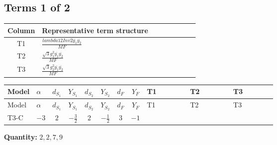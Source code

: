 \documentclass[8pt]{article}
\begin{document}
\begin{landscape}
\subsection*{Terms 1 of 2}
\begin{center}
\begin{tabular}{@{}c >{\raggedright\arraybackslash}p{0.82\linewidth}@{}}
\toprule
Column & Representative term structure \\
\midrule
T1 & \(\displaystyle \frac{lambda12Inv2 \overline{y_{1}} \overline{y_{2}}}{MF}\) \\
\midrule
T2 & \(\displaystyle \frac{\sqrt{3} g_{1}^{2} \overline{y_{1}} \overline{y_{2}}}{MF}\) \\
\midrule
T3 & \(\displaystyle \frac{\sqrt{3} g_{2}^{2} \overline{y_{1}} \overline{y_{2}}}{MF}\) \\
\midrule
\bottomrule
\end{tabular}
\end{center}
\smallskip
\tiny
\begin{longtable}{@{}llcccccc >{\raggedright\arraybackslash}p{0.21\linewidth} >{\raggedright\arraybackslash}p{0.21\linewidth} >{\raggedright\arraybackslash}p{0.21\linewidth}@{}}
\toprule
Model & $\alpha$ & $d_{S_1}$ & $Y_{S_1}$ & $d_{S_2}$ & $Y_{S_2}$ & $d_F$ & $Y_F$ & T1 & T2 & T3 \\
\midrule
\endfirsthead
\toprule
Model & $\alpha$ & $d_{S_1}$ & $Y_{S_1}$ & $d_{S_2}$ & $Y_{S_2}$ & $d_F$ & $Y_F$ & T1 & T2 & T3 \\
\midrule
\endhead
T3-C & $-3$ & $2$ & $-\frac{3}{2}$ & $2$ & $-\frac{1}{2}$ & $3$ & $-1$ & \scriptsize\adjustbox{max width=\linewidth}{$\begin{gathered} - \frac{lambda12Inv2 \overline{y_{1}} \overline{y_{2}}}{3 MF}\end{gathered}$} & \scriptsize\adjustbox{max width=\linewidth}{$\begin{gathered} - \frac{\sqrt{3} g_{1}^{2} \overline{y_{1}} \overline{y_{2}}}{2 MF}\end{gathered}$} & \scriptsize\adjustbox{max width=\linewidth}{$\begin{gathered} - \frac{\sqrt{3} g_{2}^{2} \overline{y_{1}} \overline{y_{2}}}{4 MF}\end{gathered}$} \\
\midrule
\bottomrule
\end{longtable}
\clearpage
\noindent\textbf{Quantity: }$\mathrm{2,2,7,9}$\par\smallskip

\end{landscape}
\end{document}
